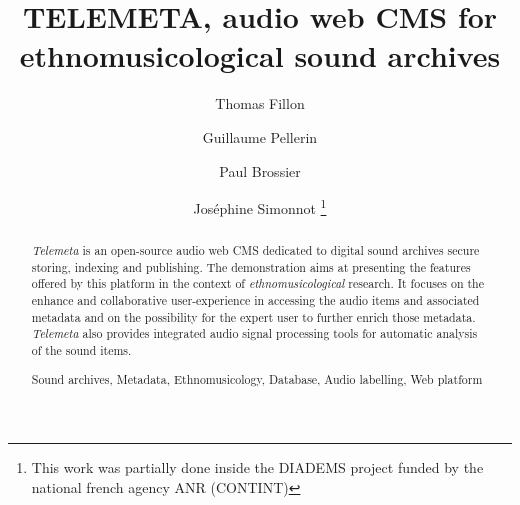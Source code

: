 \documentclass[runningheads,a4paper]{llncs}
\newcommand{\keywords}[1]{\par\addvspace\baselineskip
\noindent\keywordname\enspace\ignorespaces#1}
\begin{document}
\mainmatter  %

\title{TELEMETA, audio web CMS for ethnomusicological sound archives}


%
%
\author{Thomas Fillon \and Guillaume Pellerin \and Paul Brossier
 \and Jos{\'e}phine Simonnot 
\thanks{This work was partially done inside the DIADEMS project funded by the national french agency ANR (CONTINT)}
}
%


\maketitle

\setcounter{footnote}{0}


\begin{abstract}
\emph{Telemeta} is an open-source audio web CMS dedicated to digital sound archives secure storing, indexing and publishing. The demonstration aims at presenting the features offered by this platform in the context of \emph{ethnomusicological} research. It focuses on the enhance and collaborative user-experience in accessing the audio items and associated metadata and on the possibility for the expert user to further enrich those metadata. \emph{Telemeta} also provides integrated audio signal processing tools for automatic analysis of the sound items.
\keywords{Sound archives, Metadata, Ethnomusicology, Database, Audio labelling, Web platform}
\end{abstract}
\end{document}
